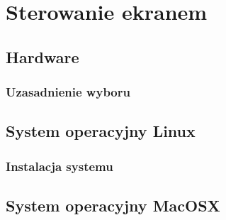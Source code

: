 \section{Sterowanie ekranem}
\label{sec:component-controll-remote-screen} %

\subsection{Hardware}

\subsubsection{Uzasadnienie wyboru}

\subsection{System operacyjny Linux}

\subsubsection{Instalacja systemu}

\subsection{System operacyjny MacOSX}
